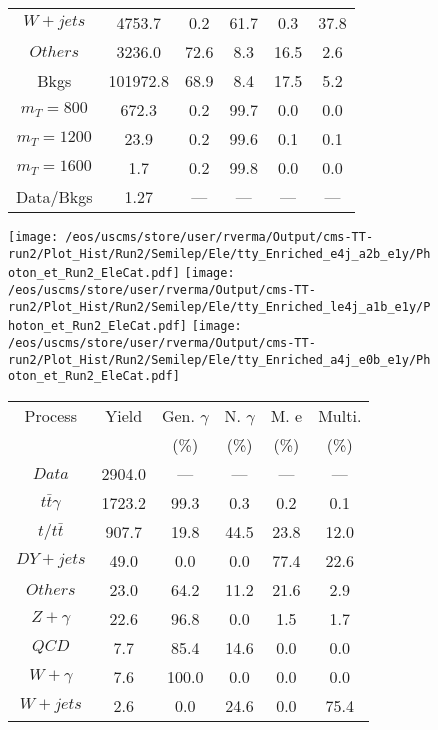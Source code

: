 \begin{figure}
\begin{minipage}[c]{0.32\textwidth}
{\begin{tabular}{cccccc}
$ W+jets $ &  4753.7 &  0.2 &  61.7 &  0.3 &  37.8\\
$ Others $ &  3236.0 &  72.6 &  8.3 &  16.5 &  2.6\\
Bkgs &  101972.8 &  68.9 &  8.4 &  17.5 &  5.2\\
$ m_{T} = 800 $ &  672.3 &  0.2 &  99.7 &  0.0 &  0.0\\
$ m_{T} = 1200 $ &  23.9 &  0.2 &  99.6 &  0.1 &  0.1\\
$ m_{T} = 1600 $ &  1.7 &  0.2 &  99.8 &  0.0 &  0.0\\
Data/Bkgs &  1.27 &  --- &  --- &  --- &  ---\\
\hline
\end{tabular}
}
\end{minipage}
\end{figure}

\begin{figure}
\centering
\texttt{[image: /eos/uscms/store/user/rverma/Output/cms-TT-run2/Plot\_Hist/Run2/Semilep/Ele/tty\_Enriched\_e4j\_a2b\_e1y/Photon\_et\_Run2\_EleCat.pdf]}
\texttt{[image: /eos/uscms/store/user/rverma/Output/cms-TT-run2/Plot\_Hist/Run2/Semilep/Ele/tty\_Enriched\_le4j\_a1b\_e1y/Photon\_et\_Run2\_EleCat.pdf]}
\texttt{[image: /eos/uscms/store/user/rverma/Output/cms-TT-run2/Plot\_Hist/Run2/Semilep/Ele/tty\_Enriched\_a4j\_e0b\_e1y/Photon\_et\_Run2\_EleCat.pdf]}
\begin{minipage}[c]{0.32\textwidth}
\centering
\tiny{
\begin{tabular}{cccccc}
\hline
Process & Yield & Gen. $\gamma$ & N. $\gamma$ & M. e & Multi. \\
 &  & (\%) & (\%) & (\%) & (\%)  \\
\hline
                                                                      $ Data $ &  2904.0 &  --- &  --- &  --- &  ---\\
$ t\bar{t}\gamma $ &  1723.2 &  99.3 &  0.3 &  0.2 &  0.1\\
$ t/t\bar{t} $ &  907.7 &  19.8 &  44.5 &  23.8 &  12.0\\
$ DY+jets $ &  49.0 &  0.0 &  0.0 &  77.4 &  22.6\\
$ Others $ &  23.0 &  64.2 &  11.2 &  21.6 &  2.9\\
$ Z+\gamma $ &  22.6 &  96.8 &  0.0 &  1.5 &  1.7\\
$ QCD $ &  7.7 &  85.4 &  14.6 &  0.0 &  0.0\\
$ W+\gamma $ &  7.6 &  100.0 &  0.0 &  0.0 &  0.0\\
$ W+jets $ &  2.6 &  0.0 &  24.6 &  0.0 &  75.4\\

\end{tabular}}
\end{minipage}
\end{figure}

